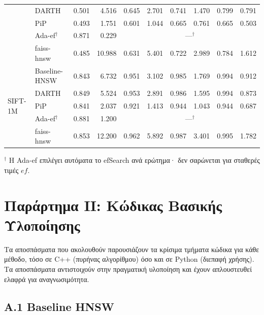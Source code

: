 \documentclass[12pt,a4paper]{article}
\begin{document}
\begin{table}[h!]
{\begin{tabular}{llrrrrrrrr}
  & DARTH         & 0.501 & 4.516 & 0.645 & 2.701 & 0.741 & 1.470 & 0.799 & 0.791 \\
  & PiP           & 0.493 & 1.751 & 0.601 & 1.044 & 0.665 & 0.761 & 0.665 & 0.503 \\
  & Ada-ef$^\dag$ & 0.871 & 0.229 & \multicolumn{6}{c}{---$^\dag$} \\
  & faiss-hnsw    & 0.485 &10.988 & 0.631 & 5.401 & 0.722 & 2.989 & 0.784 & 1.612 \\
\midrule
\multirow{5}{*}{SIFT-1M}
  & Baseline-HNSW & 0.843 & 6.732 & 0.951 & 3.102 & 0.985 & 1.769 & 0.994 & 0.912 \\
  & DARTH         & 0.849 & 5.524 & 0.953 & 2.891 & 0.986 & 1.595 & 0.994 & 0.873 \\
  & PiP           & 0.841 & 2.037 & 0.921 & 1.413 & 0.944 & 1.043 & 0.944 & 0.687 \\
  & Ada-ef$^\dag$ & 0.881 & 1.200 & \multicolumn{6}{c}{---$^\dag$} \\
  & faiss-hnsw    & 0.853 &12.200 & 0.962 & 5.892 & 0.987 & 3.401 & 0.995 & 1.782 \\
\bottomrule
\end{tabular}%
}
\smallskip

\noindent\footnotesize $^\dag$ Η Ada-ef επιλέγει αυτόματα το efSearch ανά ερώτημα· δεν σαρώνεται για σταθερές τιμές $ef$.
\end{table}


\clearpage
\section*{Παράρτημα ΙΙ: Κώδικας Βασικής Υλοποίησης}

Τα αποσπάσματα που ακολουθούν παρουσιάζουν τα κρίσιμα τμήματα κώδικα για κάθε μέθοδο, τόσο σε C++ (πυρήνας αλγορίθμου) όσο και σε Python (διεπαφή χρήσης). Τα αποσπάσματα αντιστοιχούν στην πραγματική υλοποίηση και έχουν απλουστευθεί ελαφρά για αναγνωσιμότητα.

\subsection*{Α.1 Baseline HNSW}
\end{document}
